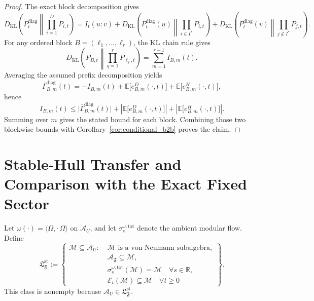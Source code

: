 \documentclass[12pt]{article}
\theoremstyle{definition}
\theoremstyle{remark}
\begin{document}
\begin{proof}
The exact block decomposition gives
\[
D_{\mathrm{KL}}\!\left(
P_t^{\mathrm{diag}}
\middle\|
\prod_{i=1}^D P_{i,t}
\right)
=
I_t(u:v)
+
D_{\mathrm{KL}}\!\left(
P_t^{\mathrm{diag}}(u)
\middle\|
\prod_{i\in I^*} P_{i,t}
\right)
+
D_{\mathrm{KL}}\!\left(
P_t^{\mathrm{diag}}(v)
\middle\|
\prod_{j\notin I^*} P_{j,t}
\right).
\]
For any ordered block \(B=(\ell_1,\dots,\ell_r)\), the KL chain rule
gives
\[
D_{\mathrm{KL}}\!\left(
P_{B,t}
\middle\|
\prod_{q=1}^r P_{\ell_q,t}
\right)
=
\sum_{m=1}^{r-1} I_{B,m}(t).
\]
Averaging the assumed prefix decomposition yields
\[
\overline{\Gamma}_{B,m}^{\mathrm{diag}}(t)
=
-I_{B,m}(t)
+
\mathbb E\!\bigl[e_{B,m}^{D}(\cdot,t)\bigr]
+
\mathbb E\!\bigl[e_{B,m}^{H}(\cdot,t)\bigr],
\]
hence
\[
I_{B,m}(t)
\le
\bigl|\overline{\Gamma}_{B,m}^{\mathrm{diag}}(t)\bigr|
+
\left|
\mathbb E\!\bigl[e_{B,m}^{D}(\cdot,t)\bigr]
\right|
+
\left|
\mathbb E\!\bigl[e_{B,m}^{H}(\cdot,t)\bigr]
\right|.
\]
Summing over \(m\) gives the stated bound for each block. Combining
those two blockwise bounds with
Corollary~\ref{cor:conditional_b2b} proves the claim.
\end{proof}

\section{Stable-Hull Transfer and Comparison with the Exact Fixed Sector}\label{sec:haff}

Let \(\omega(\cdot)=\langle\Omega,\cdot\,\Omega\rangle\) on
\(\mathcal A_U\), and let \(\sigma_s^{\omega,\mathrm{tot}}\) denote the
ambient modular flow. Define
\[
\mathfrak L_{\mathfrak F}^{\mathrm{st}}
:=
\left\{
\begin{aligned}
\mathcal M\subseteq \mathcal A_U:\;&
\mathcal M \text{ is a von Neumann subalgebra},\\
&
\mathcal A_{\mathfrak F}\subseteq \mathcal M,\\
&
\sigma_s^{\omega,\mathrm{tot}}(\mathcal M)=\mathcal M
\quad \forall s\in\mathbb R,\\
&
\mathcal E_t(\mathcal M)\subseteq \mathcal M
\quad \forall t\ge 0
\end{aligned}
\right\}.
\]
This class is nonempty because \(\mathcal A_U\in \mathfrak L_{\mathfrak F}^{\mathrm{st}}\).
\end{document}
